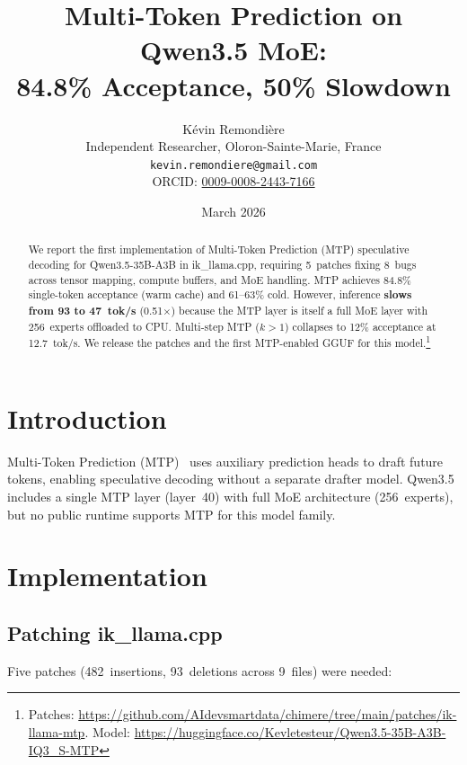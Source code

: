\documentclass[10pt,a4paper]{article}
\title{Multi-Token Prediction on Qwen3.5 MoE:\\84.8\% Acceptance, 50\% Slowdown}
\author{
  K\'evin Remondi\`ere\\
  Independent Researcher, Oloron-Sainte-Marie, France\\
  \texttt{kevin.remondiere@gmail.com}\\
  ORCID: \href{https://orcid.org/0009-0008-2443-7166}{0009-0008-2443-7166}
}
\date{March 2026}
\begin{document}
\maketitle

\begin{abstract}
We report the first implementation of Multi-Token Prediction (MTP) speculative decoding for Qwen3.5-35B-A3B in ik\_llama.cpp, requiring 5~patches fixing 8~bugs across tensor mapping, compute buffers, and MoE handling. MTP achieves 84.8\% single-token acceptance (warm cache) and 61--63\% cold. However, inference \textbf{slows from 93 to 47~tok/s} (0.51$\times$) because the MTP layer is itself a full MoE layer with 256~experts offloaded to CPU. Multi-step MTP ($k{>}1$) collapses to 12\% acceptance at 12.7~tok/s. We release the patches and the first MTP-enabled GGUF for this model.\footnote{Patches: \url{https://github.com/AIdevsmartdata/chimere/tree/main/patches/ik-llama-mtp}. Model: \url{https://huggingface.co/Kevletesteur/Qwen3.5-35B-A3B-IQ3_S-MTP}}
\end{abstract}

\section{Introduction}

Multi-Token Prediction (MTP)~\cite{gloeckle2024mtp} uses auxiliary prediction heads to draft future tokens, enabling speculative decoding without a separate drafter model. Qwen3.5 includes a single MTP layer (layer~40) with full MoE architecture (256~experts), but no public runtime supports MTP for this model family.

\section{Implementation}

\subsection{Patching ik\_llama.cpp}

Five patches (482~insertions, 93~deletions across 9~files) were needed:
\end{document}
